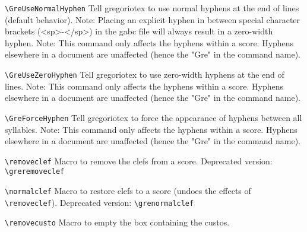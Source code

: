 \verb=\GreUseNormalHyphen=%
	Tell gregoriotex to use normal hyphens at the end of lines (default behavior).
	Note: Placing an explicit hyphen in between special character brackets (\ie <sp>-</sp>) in the gabc file will always result in a zero-width hyphen.
	Note: This command only affects the hyphens within a score.  Hyphens elsewhere in a document are unaffected (hence the "Gre" in the command name).
	
\verb=\GreUseZeroHyphen=%
	Tell gregoriotex to use zero-width hyphens at the end of lines.
	Note: This command only affects the hyphens within a score.  Hyphens elsewhere in a document are unaffected (hence the "Gre" in the command name).

\verb=\GreForceHyphen=%
	Tell gregoriotex to force the appearance of hyphens between all syllables.
	Note: This command only affects the hyphens within a score.  Hyphens elsewhere in a document are unaffected (hence the "Gre" in the command name).

\verb=\removeclef=%
	Macro to remove the clefs from a score.
	Deprecated version: \verb=\greremoveclef=

\verb=\normalclef=%
	Macro to restore clefs to a score (undoes the effects of \verb=\removeclef=).
	Deprecated version: \verb=\grenormalclef=

\verb=\removecusto=%
	Macro to empty the box containing the custos.

